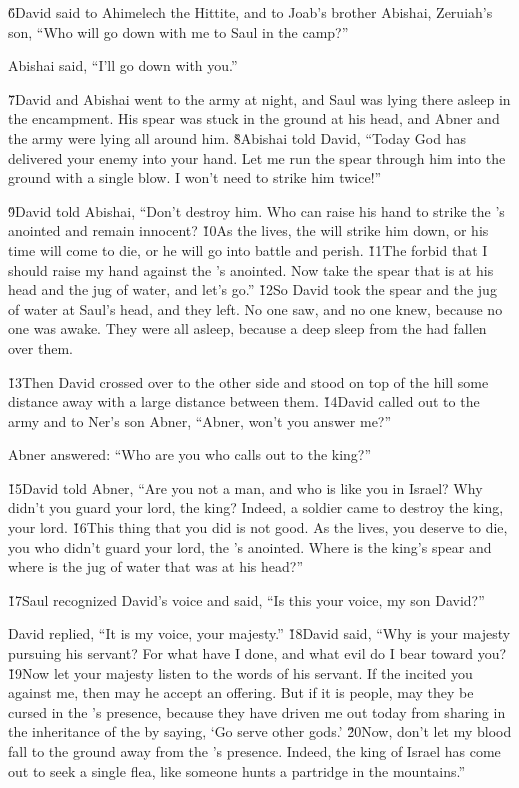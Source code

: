 \v{6}David said to Ahimelech the Hittite, and to Joab's brother Abishai, Zeruiah's son, ``Who will go down with me to Saul in the camp?''

Abishai said, ``I'll go down with you.''

\v{7}David and Abishai went to the army at night, and Saul was lying there asleep in the encampment. His spear was stuck in the ground at his head, and Abner and the army were lying all around him. \v{8}Abishai told David, ``Today God has delivered your enemy into your hand. Let me run the spear through him into the ground with a single blow. I won't need to strike him twice!''

\v{9}David told Abishai, ``Don't destroy him. Who can raise his hand to strike the 's anointed and remain innocent? \v{10}As the  lives, the  will strike him down, or his time will come to die, or he will go into battle and perish. \v{11}The  forbid that I should raise my hand against the 's anointed. Now take the spear that is at his head and the jug of water, and let's go.'' \v{12}So David took the spear and the jug of water at Saul's head, and they left. No one saw, and no one knew, because no one was awake. They were all asleep, because a deep sleep from the  had fallen over them.

\v{13}Then David crossed over to the other side and stood on top of the hill some distance away with a large distance between them. \v{14}David called out to the army and to Ner's son Abner, ``Abner, won't you answer me?''

Abner answered: ``Who are you who calls out to the king?''

\v{15}David told Abner, ``Are you not a man, and who is like you in Israel? Why didn't you guard your lord, the king? Indeed, a soldier came to destroy the king, your lord. \v{16}This thing that you did is not good. As the  lives, you deserve to die, you who didn't guard your lord, the 's anointed. Where is the king's spear and where is the jug of water that was at his head?''

\v{17}Saul recognized David's voice and said, ``Is this your voice, my son David?''

David replied, ``It is my voice, your majesty.'' \v{18}David said, ``Why is your majesty pursuing his servant? For what have I done, and what evil do I bear toward you? \v{19}Now let your majesty listen to the words of his servant. If the  incited you against me, then may he accept an offering. But if it is people, may they be cursed in the 's presence, because they have driven me out today from sharing in the inheritance of the  by saying, `Go serve other gods.' \v{20}Now, don't let my blood fall to the ground away from the 's presence. Indeed, the king of Israel has come out to seek a single flea, like someone hunts a partridge in the mountains.''

